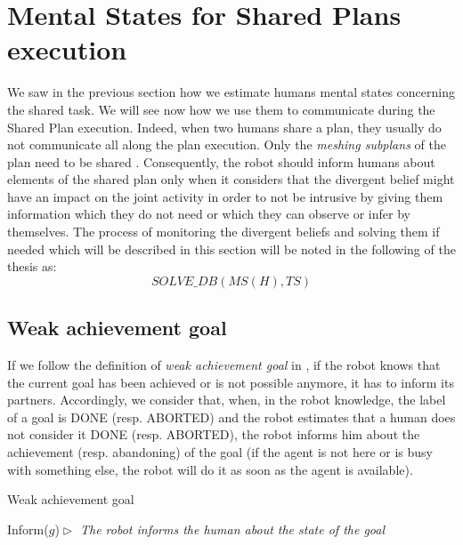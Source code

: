 \documentclass[english,a4paper,11pt,twoside]{StyleThese}
\begin{document}
\section{Mental States for Shared Plans execution}

We saw in the previous section how we estimate humans mental states concerning the shared task. We will see now how we use them to communicate during the Shared Plan execution. Indeed, when two humans share a plan, they usually do not communicate all along the plan execution. Only the \textit{meshing subplans} of the plan need to be shared \cite{bratman1993shared}. Consequently, the robot should inform humans about elements of the shared plan only when it considers that the divergent belief might have an impact on the joint activity in order to not be intrusive by giving them information which they do not need or which they can observe or infer by themselves. The process of monitoring the divergent beliefs and solving them if needed which will be described in this section will be noted in the following of the thesis as:
$$SOLVE\_DB(MS(H), TS)$$

\subsection{Weak achievement goal}

If we follow the definition of \textit{weak achievement goal} in \cite{cohen1991teamwork}, if the robot knows that the current goal has been achieved or is not possible anymore, it has to inform its partners. Accordingly, we consider that, when, in the robot knowledge, the label of a goal is DONE (resp. ABORTED) and the robot estimates that a human does not consider it DONE (resp. ABORTED), the robot informs him about the achievement (resp. abandoning) of the goal (if the agent is not here or is busy with something else, the robot will do it as soon as the agent is available).

\begin{algorithm}
\caption{Weak achievement goal}
\label{alg:informGoal}
\begin{algorithmic}
\STATE Inform($g$)\hfill \textit{$\vartriangleright$ The robot informs the human about the state of the goal}
\ENDIF
\end{algorithmic}
\end{algorithm} 
\end{document}
